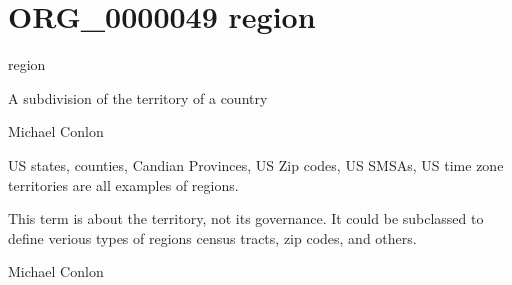 \documentclass[letterpaper,10pt,english]{sphinxmanual}
\begin{document}
\section{ORG\_0000049 \sphinxhyphen{} region}
\label{\detokenize{doc-ORG_0000049:org-0000049-region}}\label{\detokenize{doc-ORG_0000049:index-0}}\label{\detokenize{doc-ORG_0000049::doc}}
\begin{sphinxShadowBox}

\sphinxAtStartPar
region
\end{sphinxShadowBox}

\begin{sphinxShadowBox}

\sphinxAtStartPar
A subdivision of the territory of a country
\end{sphinxShadowBox}

\begin{sphinxShadowBox}

\sphinxAtStartPar
Michael Conlon 
\end{sphinxShadowBox}

\begin{sphinxShadowBox}

\sphinxAtStartPar
US states, counties, Candian Provinces, US Zip codes, US SMSAs, US time zone territories are all examples of regions.
\end{sphinxShadowBox}

\begin{sphinxShadowBox}

\sphinxAtStartPar
This term is about the territory, not its governance.  It could be subclassed to define verious types of regions \textendash{} census tracts, zip codes, and others.
\end{sphinxShadowBox}

\begin{sphinxShadowBox}

\sphinxAtStartPar
Michael Conlon 
\end{sphinxShadowBox}
\begin{quote}
\label{\detokenize{doc-ORG_0000050:org-0000050}}\label{\detokenize{doc-ORG_0000050:populated-place}}\label{\detokenize{doc-ORG_0000050:org-0000050}}
\ignorespaces \end{quote}
\end{document}
